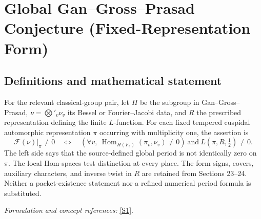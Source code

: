 \documentclass[11pt,a4paper]{article}
\newcommand{\sref}[2]{\hyperlink{source:#1:#2}{[S#2]}}
\newif\ifshowcatalogue
\newcommand{\cataloguescope}[1]{\ifshowcatalogue
 \paragraph{Exact scope in the supplied catalogue.}
 \begin{quote}\small #1\end{quote}\fi}
\numberwithin{equation}{section}
\begin{document}
\setcounter{section}{0}
\clearpage
\section*{\texorpdfstring{Global Gan–Gross–Prasad Conjecture (Fixed-Representation Form)}{Global Gan–Gross–Prasad Conjecture (Fixed-Representation Form)}}\label{statement}
\subsection{Definitions and mathematical statement}
For the relevant classical-group pair, let $H$ be the subgroup in Gan--Gross--Prasad, $\nu=\bigotimes'_v\nu_v$ its Bessel or Fourier--Jacobi data, and $R$ the prescribed representation defining the finite $L$-function. For each fixed tempered cuspidal automorphic representation $\pi$ occurring with multiplicity one, the assertion is
\[
 \mathcal F(\nu)|_\pi\ne0
 \quad\Longleftrightarrow\quad
 \left(\forall v,\ \operatorname{Hom}_{H(F_v)}(\pi_v,\nu_v)\ne0\right)
 \ \text{and}\ L(\pi,R,\tfrac12)\ne0.
\]
The left side says that the source-defined global period is not identically zero on $\pi$. The local Hom-spaces test distinction at every place. The form signs, covers, auxiliary characters, and inverse twist in $R$ are retained from Sections 23--24. Neither a packet-existence statement nor a refined numerical period formula is substituted.
\par\smallskip\textit{Formulation and concept references:} \sref{statement}{1}.
\cataloguescope{For every number field F, let E be F, a quadratic extension, or F\ensuremath{\times}F, and let W\ensuremath{\subset}V be a nondegenerate relevant pair with form sign epsilon, split W-perp, and epsilon*(-1)\textasciicircum{}dim(W-perp)=-1; a two-dimensional orthogonal V or W is required to be nonsplit. Use exactly the groups, covers, Bessel/Fourier–Jacobi representation nu and auxiliary data of Gan–Gross–Prasad Section 23, and R of Section 24, including the skew-hermitian character mu and its matching inverse twist in R. For every irreducible tempered representation pi occurring with multiplicity one in the cuspidal automorphic spectrum, Conjecture 24.1 asserts: the global period F(nu) is nonzero on pi if and only if Hom\_H(F\_v)(pi\_v,nu\_v) is nonzero for every place v and L(pi,R,1/2) is nonzero. Quantification is over all data permitted there, including relevant orthogonal, hermitian, symplectic/metaplectic and skew-hermitian cases. This is the fixed-representation equivalence, not the refined period identity or packet-existence formulation.}
\end{document}
